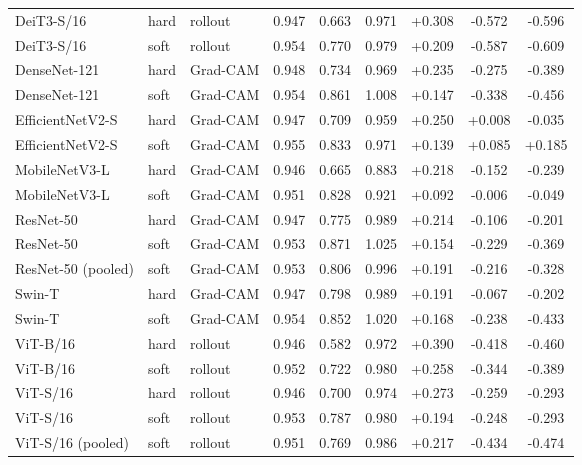 \begin{table}[!htb]
{\begin{tabular}{lllcccccc}
DeiT3-S/16 & hard & rollout & 0.947 & 0.663 & 0.971 & +0.308 & -0.572 & -0.596 \\
DeiT3-S/16 & soft & rollout & 0.954 & 0.770 & 0.979 & +0.209 & -0.587 & -0.609 \\
DenseNet-121 & hard & Grad-CAM & 0.948 & 0.734 & 0.969 & +0.235 & -0.275 & -0.389 \\
DenseNet-121 & soft & Grad-CAM & 0.954 & 0.861 & 1.008 & +0.147 & -0.338 & -0.456 \\
EfficientNetV2-S & hard & Grad-CAM & 0.947 & 0.709 & 0.959 & +0.250 & +0.008 & -0.035 \\
EfficientNetV2-S & soft & Grad-CAM & 0.955 & 0.833 & 0.971 & +0.139 & +0.085 & +0.185 \\
MobileNetV3-L & hard & Grad-CAM & 0.946 & 0.665 & 0.883 & +0.218 & -0.152 & -0.239 \\
MobileNetV3-L & soft & Grad-CAM & 0.951 & 0.828 & 0.921 & +0.092 & -0.006 & -0.049 \\
ResNet-50 & hard & Grad-CAM & 0.947 & 0.775 & 0.989 & +0.214 & -0.106 & -0.201 \\
ResNet-50 & soft & Grad-CAM & 0.953 & 0.871 & 1.025 & +0.154 & -0.229 & -0.369 \\
ResNet-50 (pooled) & soft & Grad-CAM & 0.953 & 0.806 & 0.996 & +0.191 & -0.216 & -0.328 \\
Swin-T & hard & Grad-CAM & 0.947 & 0.798 & 0.989 & +0.191 & -0.067 & -0.202 \\
Swin-T & soft & Grad-CAM & 0.954 & 0.852 & 1.020 & +0.168 & -0.238 & -0.433 \\
ViT-B/16 & hard & rollout & 0.946 & 0.582 & 0.972 & +0.390 & -0.418 & -0.460 \\
ViT-B/16 & soft & rollout & 0.952 & 0.722 & 0.980 & +0.258 & -0.344 & -0.389 \\
ViT-S/16 & hard & rollout & 0.946 & 0.700 & 0.974 & +0.273 & -0.259 & -0.293 \\
ViT-S/16 & soft & rollout & 0.953 & 0.787 & 0.980 & +0.194 & -0.248 & -0.293 \\
ViT-S/16 (pooled) & soft & rollout & 0.951 & 0.769 & 0.986 & +0.217 & -0.434 & -0.474 \\
\bottomrule
\end{tabular}}
\end{table}
